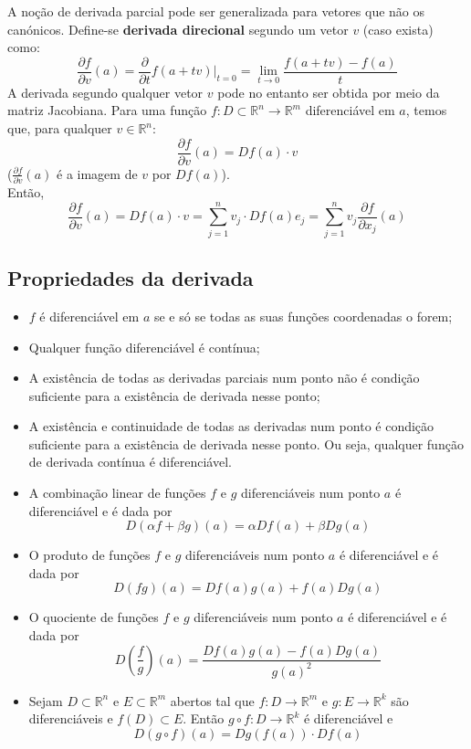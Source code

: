 \documentclass{article}
\begin{document}
A noção de derivada parcial pode ser generalizada para vetores que não os canónicos. Define-se \textbf{derivada direcional} segundo um vetor $v$ (caso exista) como:
$$
\frac{\partial f}{\partial v}(a) = \frac{\partial}{\partial t} f(a+tv) \Big|_{t=0} = \lim_{t \to 0} \frac{f(a+tv)-f(a)}{t}
$$
A derivada segundo qualquer vetor $v$ pode no entanto ser obtida por meio da matriz Jacobiana. Para uma função $f: D \subset \mathbb{R}^n \to \mathbb{R}^m$ diferenciável em $a$, temos que, para qualquer $v \in \mathbb{R}^n$:
$$
\frac{\partial f}{\partial v}(a) = Df(a) \cdot v
$$
($\frac{\partial f}{\partial v}(a)$ é a imagem de $v$ por $Df(a)$).\\
Então,
$$
\frac{\partial f}{\partial v}(a) = Df(a)\cdot v = \sum_{j=1}^n v_j \cdot Df(a)e_j = \sum_{j=1}^n v_j \frac{\partial f}{\partial x_j} (a)
$$
\subsection{Propriedades da derivada}
\begin{itemize}
	\item $f$ é diferenciável em $a$ se e só se todas as suas funções coordenadas o forem;
	\item Qualquer função diferenciável é contínua;
	\item A existência de todas as derivadas parciais num ponto não é condição suficiente para a existência de derivada nesse ponto; 
	\item A existência e continuidade de todas as derivadas num ponto é condição suficiente para a existência de derivada nesse ponto. Ou seja, qualquer função de derivada contínua é diferenciável.
	\item A combinação linear de funções $f$ e $g$ diferenciáveis num ponto $a$ é diferenciável e é dada por $$ D(\alpha f+\beta g)(a)=\alpha Df(a)+\beta Dg(a)$$
	\item O produto de funções $f$ e $g$ diferenciáveis num ponto $a$ é diferenciável e é dada por $$ D(fg)(a)=Df(a)g(a)+f(a)Dg(a)$$
	\item O quociente de funções $f$ e $g$ diferenciáveis num ponto $a$ é diferenciável e é dada por $$ D\left(\frac{f}{g} \right)(a)=\frac{Df(a)g(a)-f(a)Dg(a)}{g(a)^2} $$
	\item Sejam $D \subset \mathbb{R}^n$ e $E \subset \mathbb{R}^m$ abertos tal que $f: D \to \mathbb{R}^m$ e $g: E \to \mathbb{R}^k$ são diferenciáveis e $f(D) \subset E$. Então $g \circ f: D \to \mathbb{R}^k$ é diferenciável e $$ D(g \circ f)(a) = Dg(f(a)) \cdot Df(a) $$
\end{itemize}
\end{document}
